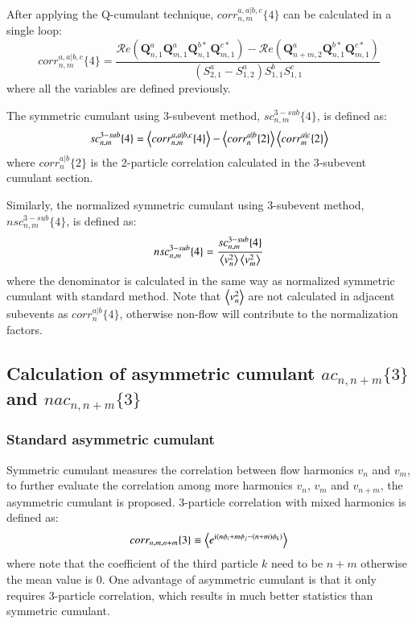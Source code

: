 After applying the Q-cumulant technique, $corr_{n,m}^{a,a|b,c}\{4\}$ can be calculated in a single loop:
\begin{equation}
corr_{n,m}^{a,a|b,c}\{4\} = \frac{\mathcal{R}\textit{e}(\pmb{Q}_{n,1}^a\pmb{Q}_{m,1}^a\pmb{Q}_{n,1}^{b*}\pmb{Q}_{m,1}^{c*})-\mathcal{R}\textit{e}(\pmb{Q}_{n+m,2}^a\pmb{Q}_{n,1}^{b*}\pmb{Q}_{m,1}^{c*})}{(S_{2,1}^a-S_{1,2}^{a})S_{1,1}^b S_{1,1}^c}
\end{equation}
where all the variables are defined previously.

The symmetric cumulant using 3-subevent method, $sc_{n,m}^{3-sub}\{4\}$, is defined as:
\begin{equation}
sc_{n,m}^{3-sub}\{4\} = \left\langle corr_{n,m}^{a,a|b,c}\{4\}\right\rangle - \left\langle corr_n^{a|b}\{2\}\right\rangle\left\langle corr_m^{a|c}\{2\}\right\rangle
\end{equation}
where $corr_n^{a|b}\{2\}$ is the 2-particle correlation calculated in the 3-subevent cumulant section.

Similarly, the normalized symmetric cumulant using 3-subevent method, $nsc_{n,m}^{3-sub}\{4\}$, is defined as:
\begin{equation}
nsc_{n,m}^{3-sub}\{4\} = \frac{sc_{n,m}^{3-sub}\{4\}}{\left\langle v_n^2\right\rangle\left\langle v_m^2\right\rangle}
\end{equation}
where the denominator is calculated in the same way as normalized symmetric cumulant with standard method. Note that $\left\langle v_n^2\right\rangle$ are not calculated in adjacent subevents as $corr_n^{a|b}\{4\}$, otherwise non-flow will contribute to the normalization factors.



\subsection{Calculation of asymmetric cumulant $ac_{n,n+m}\{3\}$ and $nac_{n,n+m}\{3\}$}
\subsubsection{Standard asymmetric cumulant}
Symmetric cumulant measures the correlation between flow harmonics $v_n$ and $v_m$, to further evaluate the correlation among more harmonics $v_n$, $v_m$ and $v_{n+m}$, the asymmetric cumulant is proposed. 3-particle correlation with mixed harmonics is defined as:
\begin{equation}
corr_{n,m,n+m}\{3\}\equiv\left\langle e^{\text{i}(n\phi_i+m\phi_j-(n+m)\phi_k)}\right\rangle
\end{equation}
where note that the coefficient of the third particle $k$ need to be $n+m$ otherwise the mean value is 0. One advantage of asymmetric cumulant is that it only requires 3-particle correlation, which results in much better statistics than symmetric cumulant.

